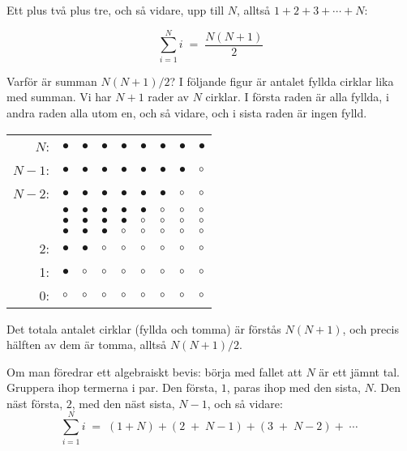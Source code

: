 \documentclass[a4paper]{article}
\begin{document}
Ett plus två plus tre, och så vidare, upp till \(N\), alltså \(1+2+3+\cdots + N\):

\[\sum_{i=1}^N i \; =\; \frac{N(N+1)}{2}\]

Varför är summan \(N(N+1)/2\)? I följande figur är antalet fyllda cirklar lika med
summan. Vi har \(N+1\) rader av \(N\) cirklar. I första raden är
alla fyllda, i andra raden alla utom en, och så vidare, och i sista raden är
ingen fylld.

\begin{center}
\begin{tabular}{rllllllll}
\(N\): & \(\bullet\) & \(\bullet\) & \(\bullet\) & \(\bullet\) & \(\bullet\) & \(\bullet\) & \(\bullet\) & \(\bullet\)\\
\(N-1\): & \(\bullet\) & \(\bullet\) & \(\bullet\) & \(\bullet\) & \(\bullet\) & \(\bullet\) & \(\bullet\) & \(\circ\)\\
\(N-2\): & \(\bullet\) & \(\bullet\) & \(\bullet\) & \(\bullet\) & \(\bullet\) & \(\bullet\) & \(\circ\) & \(\circ\)\\
 & \(\bullet\) & \(\bullet\) & \(\bullet\) & \(\bullet\) & \(\bullet\) & \(\circ\) & \(\circ\) & \(\circ\)\\
 & \(\bullet\) & \(\bullet\) & \(\bullet\) & \(\bullet\) & \(\circ\) & \(\circ\) & \(\circ\) & \(\circ\)\\
 & \(\bullet\) & \(\bullet\) & \(\bullet\) & \(\circ\) & \(\circ\) & \(\circ\) & \(\circ\) & \(\circ\)\\
2: & \(\bullet\) & \(\bullet\) & \(\circ\) & \(\circ\) & \(\circ\) & \(\circ\) & \(\circ\) & \(\circ\)\\
1: & \(\bullet\) & \(\circ\) & \(\circ\) & \(\circ\) & \(\circ\) & \(\circ\) & \(\circ\) & \(\circ\)\\
0: & \(\circ\) & \(\circ\) & \(\circ\) & \(\circ\) & \(\circ\) & \(\circ\) & \(\circ\) & \(\circ\)\\
\end{tabular}
\end{center}

Det totala antalet
cirklar (fyllda och tomma) är förstås \(N(N+1)\), och precis hälften av dem är tomma,
alltså \(N(N+1)/2\).

Om man föredrar ett algebraiskt bevis: börja med fallet att \(N\) är ett jämnt
tal. Gruppera ihop termerna i par. Den första, \(1\), paras ihop med den sista,
\(N\). Den
näst första, \(2\), med den näst sista, \(N-1\), och så vidare:
\[
\sum_{i=1}^N i \; =\;
(1+N)  + 
(2\; + \; N\!-\! 1)  + 
(3\; + \; N\!-\! 2)  + \;\cdots\; \]
\end{document}
